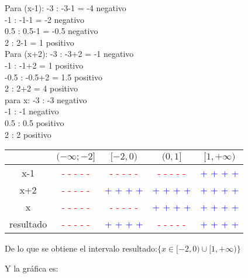 \documentclass[12pt]{article}
\newcommand{\p}{\textcolor{Blue}{+ + + +}}
\newcommand{\n}{\textcolor{Red}{- - - - -}}
\begin{document}
    Para (x-1):
    -3 : -3-1 = -4 negativo\\
    -1 : -1-1 = -2 negativo\\
    0.5 : 0.5-1 = -0.5 negativo\\
    2  : 2-1 = 1 positivo\\

    Para (x+2):
    -3 : -3+2 = -1 negativo\\
    -1 : -1+2 = 1 positivo\\
    -0.5 : -0.5+2 = 1.5 positivo \\
    2 : 2+2 = 4 positivo\\

    para x:
    -3 : -3 negativo\\
    -1 : -1 negativo\\
    0.5 : 0.5 positivo\\
    2 : 2 positivo\\

\vspace*{1cm}
    \begin{tabular}{|c|c|c|c|c|}
        \hline
            &$ (-\infty;-2]$&   $[-2,0)$ &$ (0,1] $ &$[1,+\infty)$\\\hline
        x-1 &  \n   & \n    & \n    & \p \\\hline
        x+2 & \n    & \p    & \p    & \p \\\hline
        x   & \n    & \n    & \p    & \p \\\hline
    resultado& \n   & \p    & \n    & \p \\\hline
    \end{tabular}
    \vspace*{1cm}

    De lo que se obtiene el intervalo resultado:$ \{x\in  [-2,0) \cup [1,+\infty) \}$

    Y la gráfica es:
\end{document}
